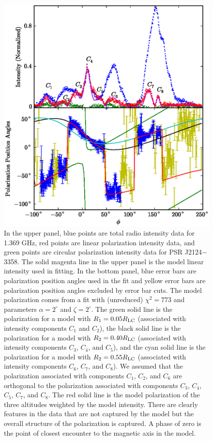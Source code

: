 \begin{figure}[htbp]
\begin{center}
\includegraphics[scale=.8]{chapters/applicationOfNumericalModel/figures/intAndPAJ2124alpha2zeta2.eps}
\caption[Intensity and polarization data for PSR J2124$-$3358 overlaid with model]{\label{fig:PlotJ2124intPA}
In the upper panel, blue points are total radio intensity data for 1.369 GHz, red points are linear polarization intensity data,
and green points are circular polarization intensity data for PSR J2124$-$3358.  The solid magenta line in the upper panel is
the model linear intensity used in fitting.  In the bottom panel, blue error bars are polarization position angles
used in the fit and yellow error bars are polarization position angles excluded by error bar cuts.
The model polarization comes from
a fit with (unreduced) $\chi^2=773$ and parameters $\alpha=2^{\circ}$ and $\zeta=2^{\circ}$.  The green solid line is the polarization for
a model with $R_{1}=0.05R_{\rm{LC}}$ (associated with intensity components $C_1$ and $C_2$),
the black solid line is the polarization for a model with $R_{2}=0.40R_{\rm{LC}}$ (associated with intensity components $C_3$, $C_4$, and $C_5$),
and the cyan solid line is the polarization for a model with $R_{2}=0.55R_{\rm{LC}}$
(associated with intensity components $C_6$, $C_7$, and $C_8$).  
We assumed that the polarization associated with
components $C_1$, $C_2$, and $C_6$ are orthogonal to the polarization associated with
components $C_3$, $C_4$, $C_5$, $C_7$, and $C_8$.
The red solid line is the model
polarization of the three altitudes weighted by the model intensity.  There are clearly 
features in the data that are not captured by the model but the overall structure of 
the polarization is captured.
A phase of zero is the point
of closest encounter to the magnetic axis in the model.
}
\end{center}
\end{figure}


